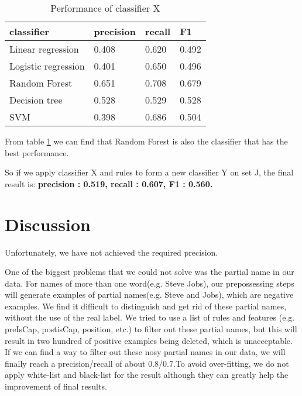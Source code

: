\documentclass{article}
\begin{document}
\begin{table}[h]
\centering
\caption{Performance of classifier X}
\label{my-label2}
\begin{tabular}{llll}
\toprule
classifier          & precision & recall & F1    \\
\midrule 
Linear regression   & 0.408     & 0.620  & 0.492 \\
Logistic regression & 0.401     & 0.650  & 0.496 \\
Random Forest       & 0.651     & 0.708  & 0.679 \\
Decision tree       & 0.528     & 0.529  & 0.528 \\
SVM                 & 0.398     & 0.686  & 0.504 \\
\bottomrule
\end{tabular}
\end{table}

From table \ref{my-label2} we can find that Random Forest is also the classifier that has the best performance.

So if we apply classifier X and rules to form a new classifier Y on set J, the final result is:
\textbf{precision : 0.519, recall : 0.607, F1 : 0.560.   }

\section{Discussion}

Unfortunately, we have not achieved the required precision. 

One of the biggest problems that we could not solve was the partial name in our data. For names of more than one word(e.g. Steve Jobs), our prepossessing steps will generate examples of partial names(e.g. Steve and Jobs), which are negative examples. We find it difficult to distinguish and get rid of these partial names, without the use of the real label. We tried to use a list of rules and features (e.g. preIsCap, postisCap, position, etc.) to filter out these partial names, but this will result in two hundred of positive examples being deleted, which is unacceptable. If we can find a way to filter out these nosy partial names in our data, we will finally reach a precision/recall of about 0.8/0.7.To avoid over-fitting, we do not apply white-list and black-list for the result although they can greatly help the improvement of final results. 
\end{document}
